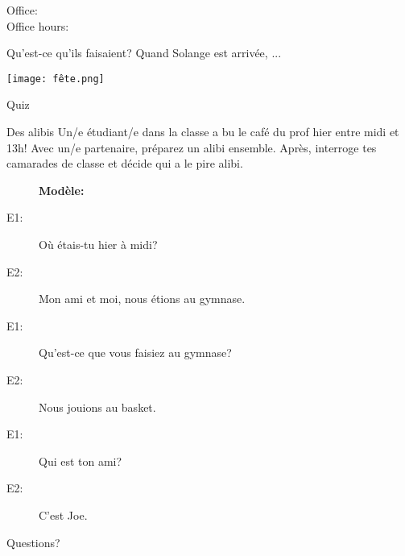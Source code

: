 \documentclass{beamer}
\subtitle[Contrastes au passé]{D'autres contrastes au passé}
\begin{document}
  \begin{frame}
    \titlepage
    \tiny{Office: \\
          Office hours: }
  \end{frame}

  \begin{frame}[b]{Qu'est-ce qu'ils faisaient?}
    Quand Solange est arrivée, ... \\
    \begin{center}
      \texttt{[image: fête.png]}
    \end{center}
  \end{frame}

  \begin{frame}{}
    \begin{center}
      \Large Quiz
    \end{center}
  \end{frame}

  \begin{frame}{Des alibis}
    Un/e étudiant/e dans la classe a bu le café du prof hier entre midi et 13h!
    Avec un/e partenaire, préparez un alibi ensemble.
    Après, interroge  tes camarades de classe et décide qui a le pire  alibi.
    \begin{description}
      \item[] \textbf{Modèle:}
      \item[E1:] Où étais-tu hier à midi?
      \item[E2:] Mon ami et moi, nous étions au gymnase.
      \item[E1:] Qu'est-ce que vous faisiez au gymnase?
      \item[E2:] Nous jouions au basket.
      \item[E1:] Qui est ton ami?
      \item[E2:] C'est Joe.
    \end{description}
  \end{frame}

  \begin{frame}{}
    \begin{center}
      \Large Questions?
    \end{center}
  \end{frame}
\end{document}

